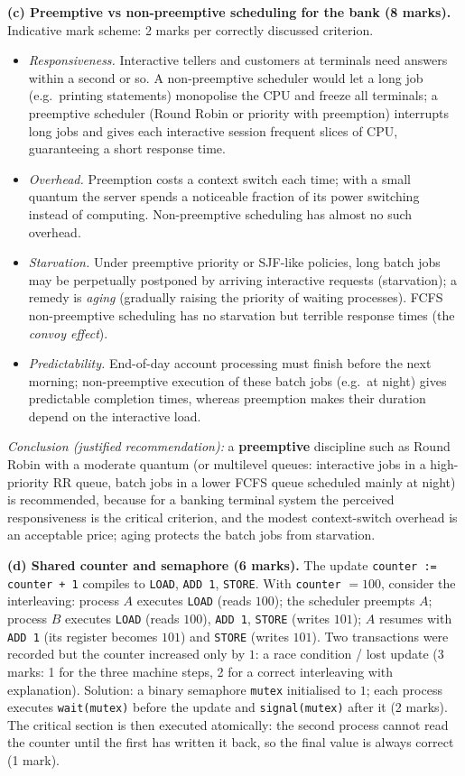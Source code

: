 \documentclass[11pt]{article}
\newcommand{\cle}[1]{{\popxbold\color{popdark}#1}}
\begin{document}
\begin{corrige}
\textbf{(c) Preemptive vs non-preemptive scheduling for the bank (8 marks).} Indicative mark scheme: 2 marks per correctly discussed criterion.
\begin{itemize}
\item \emph{Responsiveness.} Interactive tellers and customers at terminals need answers within a second or so. A non-preemptive scheduler would let a long job (e.g.\ printing statements) monopolise the CPU and freeze all terminals; a preemptive scheduler (Round Robin or priority with preemption) interrupts long jobs and gives each interactive session frequent slices of CPU, guaranteeing a short \cle{response time}.
\item \emph{Overhead.} Preemption costs a context switch each time; with a small quantum the server spends a noticeable fraction of its power switching instead of computing. Non-preemptive scheduling has almost no such overhead.
\item \emph{Starvation.} Under preemptive priority or SJF-like policies, long batch jobs may be perpetually postponed by arriving interactive requests (starvation); a remedy is \emph{aging} (gradually raising the priority of waiting processes). FCFS non-preemptive scheduling has no starvation but terrible response times (the \emph{convoy effect}).
\item \emph{Predictability.} End-of-day account processing must finish before the next morning; non-preemptive execution of these batch jobs (e.g.\ at night) gives predictable completion times, whereas preemption makes their duration depend on the interactive load.
\end{itemize}
\emph{Conclusion (justified recommendation):} a \textbf{preemptive} discipline such as Round Robin with a moderate quantum (or multilevel queues: interactive jobs in a high-priority RR queue, batch jobs in a lower FCFS queue scheduled mainly at night) is recommended, because for a banking terminal system the perceived responsiveness is the critical criterion, and the modest context-switch overhead is an acceptable price; aging protects the batch jobs from starvation.

\textbf{(d) Shared counter and semaphore (6 marks).} The update \texttt{counter := counter + 1} compiles to \texttt{LOAD}, \texttt{ADD 1}, \texttt{STORE}. With \texttt{counter} $= 100$, consider the interleaving: process $A$ executes \texttt{LOAD} (reads $100$); the scheduler preempts $A$; process $B$ executes \texttt{LOAD} (reads $100$), \texttt{ADD 1}, \texttt{STORE} (writes $101$); $A$ resumes with \texttt{ADD 1} (its register becomes $101$) and \texttt{STORE} (writes $101$). Two transactions were recorded but the counter increased only by $1$: a \cle{race condition} / lost update (3 marks: 1 for the three machine steps, 2 for a correct interleaving with explanation). Solution: a binary semaphore \texttt{mutex} initialised to $1$; each process executes \texttt{wait(mutex)} before the update and \texttt{signal(mutex)} after it (2 marks). The critical section is then executed atomically: the second process cannot read the counter until the first has written it back, so the final value is always correct (1 mark).
\end{corrige}
\end{document}
